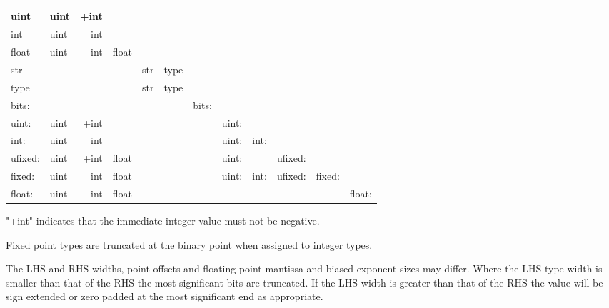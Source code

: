             \begin{tabular}{| l | l r l l l l l l l l l |}
            \hline
            uint    & uint & +int &       &     &      &       &       &      &         &        &        \\ \hline
            int     & uint & int  &       &     &      &       &       &      &         &        &        \\ \hline
            float   & uint & int  & float &     &      &       &       &      &         &        &        \\ \hline
            str     &      &      &       & str & type &       &       &      &         &        &        \\ \hline
            type    &      &      &       & str & type &       &       &      &         &        &        \\ \hline
            bits:   &      &      &       &     &      & bits: &       &      &         &        &        \\ \hline
            uint:   & uint & +int &       &     &      &       & uint: &      &         &        &        \\ \hline
            int:    & uint & int  &       &     &      &       & uint: & int: &         &        &        \\ \hline
            ufixed: & uint & +int & float &     &      &       & uint: &      & ufixed: &        &        \\ \hline
            fixed:  & uint & int  & float &     &      &       & uint: & int: & ufixed: & fixed: &        \\ \hline
            float:  & uint & int  & float &     &      &       &       &      &         &        & float: \\ \hline
            \end{tabular}

            "+int" indicates that the immediate integer value must not be
            negative.
             
            Fixed point types are truncated at the binary point when assigned
            to integer types.
            
            The LHS and RHS widths, point offsets and floating point mantissa
            and biased exponent sizes may differ. Where the LHS type width is
            smaller than that of the RHS the most significant bits are
            truncated. If the LHS width is greater than that of the RHS the
            value will be sign extended or zero padded at the most significant
            end as appropriate.
            
